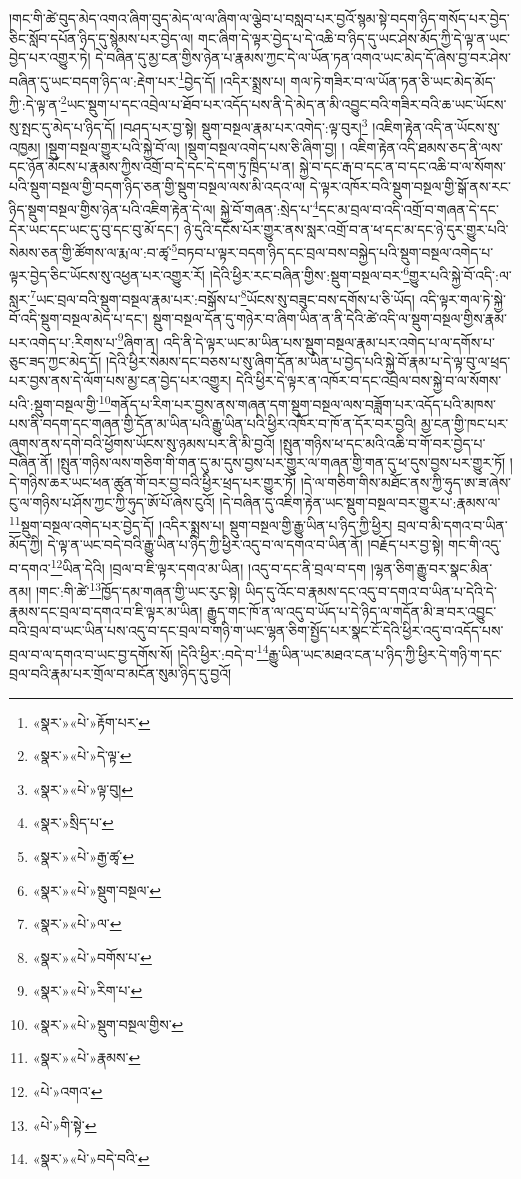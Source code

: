 །གང་གི་ཚེ་བུད་མེད་འགའ་ཞིག་བུད་མེད་ལ་ལ་ཞིག་ལ་ལྕེབ་པ་བསླབ་པར་བྱའོ་སྙམ་སྟེ་བདག་ཉིད་གསོད་པར་བྱེད་ཅིང་སློབ་དཔོན་ཉིད་དུ་སྙེམས་པར་བྱེད་ལ། གང་ཞིག་དེ་ལྟར་བྱེད་པ་དེ་འཆི་བ་ཉིད་དུ་ཡང་ཤེས་མོད་ཀྱི་དེ་ལྟ་ན་ཡང་བྱེད་པར་འགྱུར་ཏེ། དེ་བཞིན་དུ་མྱ་ངན་གྱིས་ཉེན་པ་རྣམས་ཀྱང་དེ་ལ་ཡོན་ཏན་འགའ་ཡང་མེད་དོ་ཞེས་བྱ་བར་ཤེས་བཞིན་དུ་ཡང་བདག་ཉིད་ལ་:རྡེག་པར་\footnote{«སྣར་»«པེ་»རྟོག་པར་}བྱེད་དོ། །འདིར་སྨྲས་པ། གལ་ཏེ་གཟིར་བ་ལ་ཡོན་ཏན་ཅི་ཡང་མེད་མོད་ཀྱི་:དེ་ལྟ་ན་\footnote{«སྣར་»«པེ་»དེ་ལྟ་}ཡང་སྡུག་པ་དང་འབྲེལ་པ་ཐོབ་པར་འདོད་པས་ནི་དེ་མེད་ན་མི་འབྱུང་བའི་གཟིར་བའི་ཆ་ཡང་ཡོངས་སུ་སྤང་དུ་མེད་པ་ཉིད་དོ། །བཤད་པར་བྱ་སྟེ། སྡུག་བསྔལ་རྣམ་པར་འགེད་:ལྟ་བུར།\footnote{«སྣར་»«པེ་»ལྟ་བུ།} །འཇིག་རྟེན་འདི་ན་ཡོངས་སུ་འཁྱམ། །སྡུག་བསྔལ་གྱུར་པའི་སྐྱེ་བོ་ལ། །སྡུག་བསྔལ་འགེད་པས་ཅི་ཞིག་བྱ། །
འཇིག་རྟེན་འདི་ཐམས་ཅད་ནི་ལས་དང་ཉོན་མོངས་པ་རྣམས་ཀྱིས་འགྲོ་བ་དེ་དང་དེ་དག་ཏུ་ཁྲིད་པ་ན། སྐྱེ་བ་དང་རྒ་བ་དང་ན་བ་དང་འཆི་བ་ལ་སོགས་པའི་སྡུག་བསྔལ་གྱི་བདག་ཉིད་ཅན་གྱི་སྡུག་བསྔལ་ལས་མི་འདའ་ལ། དེ་ལྟར་འཁོར་བའི་སྡུག་བསྔལ་གྱི་སྒོ་ནས་རང་ཉིད་སྡུག་བསྔལ་གྱིས་ཉེན་པའི་འཇིག་རྟེན་དེ་ལ། སྐྱེ་བོ་གཞན་:སྲེད་པ་\footnote{«སྣར་»སྲིད་པ་}དང་མ་བྲལ་བ་འདི་འགྲོ་བ་གཞན་དེ་དང་དེར་ཡང་དང་ཡང་དུ་བུ་དང་བུ་མོ་དང་། ཉེ་དུའི་དངོས་པོར་གྱུར་ནས་སླར་འགྲོ་བ་ན་ཕ་དང་མ་དང་ཉེ་དུར་གྱུར་པའི་སེམས་ཅན་གྱི་ཚོགས་ལ་རྨ་ལ་:བ་ཚྭ་\footnote{«སྣར་»«པེ་»རྒྱ་ཚྭ་}བཏབ་པ་ལྟར་བདག་ཉིད་དང་བྲལ་བས་བསྐྱེད་པའི་སྡུག་བསྔལ་འགེད་པ་ལྟར་བྱེད་ཅིང་ཡོངས་སུ་འཕྱན་པར་འགྱུར་རོ། །དེའི་ཕྱིར་རང་བཞིན་གྱིས་:སྡུག་བསྔལ་བར་\footnote{«སྣར་»«པེ་»སྡུག་བསྔལ་}གྱུར་པའི་སྐྱེ་བོ་འདི་:ལ་སླར་\footnote{«སྣར་»«པེ་»ལ་}ཡང་བྲལ་བའི་སྡུག་བསྔལ་རྣམ་པར་:བསྒོས་པ་\footnote{«སྣར་»«པེ་»བགོས་པ་}ཡོངས་སུ་བཟུང་བས་དགོས་པ་ཅི་ཡོད། འདི་ལྟར་གལ་ཏེ་སྐྱེ་བོ་འདི་སྡུག་བསྔལ་མེད་པ་དང་། སྡུག་བསྔལ་དོན་དུ་གཉེར་བ་ཞིག་ཡིན་ན་ནི་དེའི་ཚེ་འདི་ལ་སྡུག་བསྔལ་གྱིས་རྣམ་པར་འགེད་པ་:རིགས་པ་\footnote{«སྣར་»«པེ་»རིག་པ་}ཞིག་ན། འདི་ནི་དེ་ལྟར་ཡང་མ་ཡིན་པས་སྡུག་བསྔལ་རྣམ་པར་འགེད་པ་ལ་དགོས་པ་ཅུང་ཟད་ཀྱང་མེད་དོ། །དེའི་ཕྱིར་སེམས་དང་བཅས་པ་སུ་ཞིག་དོན་མ་ཡིན་པ་བྱེད་པའི་སྐྱེ་བོ་རྣམ་པ་དེ་ལྟ་བུ་ལ་ཕྲད་པར་བྱས་ནས་དེ་ལོག་པས་མྱ་ངན་བྱེད་པར་འགྱུར། དེའི་ཕྱིར་དེ་ལྟར་ན་འཁོར་བ་དང་འབྲེལ་བས་སྐྱེ་བ་ལ་སོགས་པའི་:སྡུག་བསྔལ་གྱི་\footnote{«སྣར་»«པེ་»སྡུག་བསྔལ་གྱིས་}གནོད་པ་རིག་པར་བྱས་ནས་གཞན་དག་སྡུག་བསྔལ་ལས་བཟློག་པར་འདོད་པའི་མཁས་པས་ནི་བདག་དང་གཞན་གྱི་དོན་མ་ཡིན་པའི་རྒྱུ་ཡིན་པའི་ཕྱིར་འཁོར་བ་ཁོ་ན་དོར་བར་བྱའི། མྱ་ངན་གྱི་ཁང་པར་ཞུགས་ནས་དགེ་བའི་ཕྱོགས་ཡོངས་སུ་ཉམས་པར་ནི་མི་བྱའོ། །སྤུན་གཉིས་ཕ་དང་མའི་འཆི་བ་གོ་བར་བྱེད་པ་བཞིན་ནོ། །སྤུན་གཉིས་ལས་གཅིག་གི་གན་དུ་མ་དུས་བྱས་པར་གྱུར་ལ་གཞན་གྱི་གན་དུ་ཕ་དུས་བྱས་པར་གྱུར་ཏོ། །དེ་གཉིས་ཆར་ཡང་ཕན་ཚུན་གོ་བར་བྱ་བའི་ཕྱིར་ཕྲད་པར་གྱུར་ཏོ། །དེ་ལ་གཅིག་གིས་མཐོང་ནས་ཀྱི་ཧུད་ཨ་ཟ་ཞེས་ངུ་ལ་གཉིས་པ་ཤོས་ཀྱང་ཀྱི་ཧུད་ཨོ་པོ་ཞེས་ངུའོ། །དེ་བཞིན་དུ་འཇིག་རྟེན་ཡང་སྡུག་བསྔལ་བར་གྱུར་པ་:རྣམས་ལ་\footnote{«སྣར་»«པེ་»རྣམས་}སྡུག་བསྔལ་འགེད་པར་བྱེད་དོ། །འདིར་སྨྲས་པ། སྡུག་བསྔལ་གྱི་རྒྱུ་ཡིན་པ་ཉིད་ཀྱི་ཕྱིར། བྲལ་བ་མི་དགའ་བ་ཡིན་མོད་ཀྱི། དེ་ལྟ་ན་ཡང་བདེ་བའི་རྒྱུ་ཡིན་པ་ཉིད་ཀྱི་ཕྱིར་འདུ་བ་ལ་དགའ་བ་ཡིན་ནོ། །བརྗོད་པར་བྱ་སྟེ། གང་གི་འདུ་བ་དགའ་\footnote{«པེ་»འགའ་}ཡིན་དེའི། །བྲལ་བ་ཇི་ལྟར་དགའ་མ་ཡིན། །འདུ་བ་དང་ནི་བྲལ་བ་དག །ལྷན་ཅིག་རྒྱུ་བར་སྣང་མིན་ནམ། །གང་:གི་ཚེ་\footnote{«པེ་»གི་སྟེ་}ཁྱོད་དམ་གཞན་གྱི་ཡང་རུང་སྟེ། ཡིད་དུ་འོང་བ་རྣམས་དང་འདུ་བ་དགའ་བ་ཡིན་པ་དེའི་དེ་རྣམས་དང་བྲལ་བ་དགའ་བ་ཇི་ལྟར་མ་ཡིན། རྒྱུད་གང་ཁོ་ན་ལ་འདུ་བ་ཡོད་པ་དེ་ཉིད་ལ་གདོན་མི་ཟ་བར་འབྱུང་བའི་བྲལ་བ་ཡང་ཡིན་པས་འདུ་བ་དང་བྲལ་བ་གཉི་ག་ཡང་ལྷན་ཅིག་སྤྱོད་པར་སྣང་ངོ་དེའི་ཕྱིར་འདུ་བ་འདོད་པས་བྲལ་བ་ལ་དགའ་བ་ཡང་བྱ་དགོས་སོ། །དེའི་ཕྱིར་:བདེ་བ་\footnote{«སྣར་»«པེ་»བདེ་བའི་}རྒྱུ་ཡིན་ཡང་མཐའ་ངན་པ་ཉིད་ཀྱི་ཕྱིར་དེ་གཉི་ག་དང་བྲལ་བའི་རྣམ་པར་གྲོལ་བ་མངོན་སུམ་ཉིད་དུ་བྱའོ། 